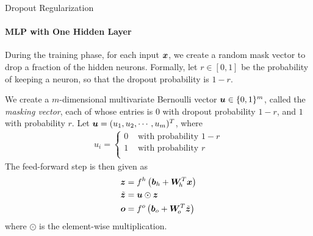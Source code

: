 \begin{frame}{Dropout Regularization}
%
\framesubtitle{MLP with One Hidden Layer}
During the training phase, for each input ${\boldsymbol x}$, we create a random mask
vector to drop a fraction of the hidden neurons. Formally, let $r \in
[0,1]$ be
the probability of keeping a neuron, 
so that the dropout probability is $1-r$.


\medskip

We create a
$m$-dimensional multivariate
Bernoulli vector ${\boldsymbol u} \in \{0,1\}^m$, called the {\em masking
vector}, each of whose entries is $0$
with dropout  probability $1-r$, and $1$ with probability $r$. 
Let ${\boldsymbol u}
= (u_{1}, u_{2}, \cdots, u_{m})^T$, where
\begin{align*}
    u_{i} = 
    \begin{cases}
        0 & \text{ with probability } 1-r\\
        1 & \text{ with probability } r\\
    \end{cases}
\end{align*}
The feed-forward step is then given as
\begin{align*}
    {\boldsymbol z} & = f^h\left({\boldsymbol b}_{h} + {\boldsymbol W}_{\!h}^T {\boldsymbol x} \right)\\
    \tilde{{\boldsymbol z}} & = {\boldsymbol u} \odot {\boldsymbol z}\\
    {\boldsymbol o} & = f^o\left({\boldsymbol b}_{o} + {\boldsymbol W}_{\!o}^T \tilde{{\boldsymbol z}} \right)
\end{align*}
where $\odot$ is the element-wise multiplication. 
\end{frame}
%
%
